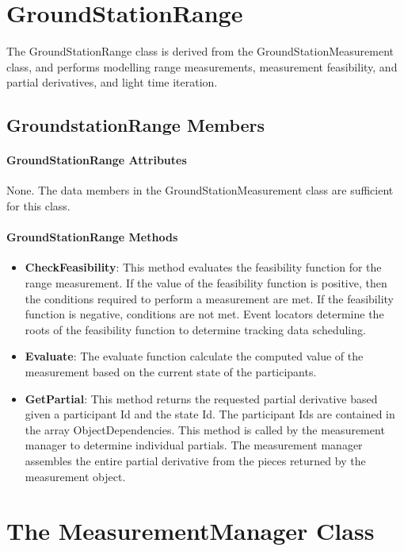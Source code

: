 \section{GroundStationRange}

The GroundStationRange class is derived from the GroundStationMeasurement class, and performs modelling range measurements, measurement feasibility, and partial derivatives, and light time iteration.

\subsection{GroundstationRange Members}

\paragraph{GroundStationRange Attributes}

None.  The data members in the GroundStationMeasurement class are sufficient for this class.

\paragraph{GroundStationRange Methods}

\begin{itemize}
\item \textbf{CheckFeasibility}:  This method evaluates the feasibility function for the range measurement. If the value of the feasibility function is positive, then the conditions required to perform a measurement are met.  If the feasibility function is negative, conditions are not met.  Event locators determine the roots of the feasibility function to determine tracking data scheduling.
\item \textbf{Evaluate}:  The evaluate function calculate the computed value of the measurement based on the current state of the participants.
\item \textbf{GetPartial}:  This method returns the requested partial derivative based given a participant Id and the state Id.  The participant Ids are contained in the array ObjectDependencies.  This method is called by the measurement manager to determine individual partials. The measurement manager assembles the entire partial derivative from the pieces returned by the measurement object.
\end{itemize}

\section{The MeasurementManager Class}

